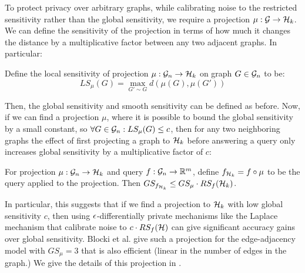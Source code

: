 To protect privacy over arbitrary graphs, while calibrating noise to the restricted sensitivity rather than the global sensitivity, we require a projection $\mu: \mathcal{G} \to \mathcal{H}_k$. We can define the sensitivity of the projection in terms of how much it changes the distance by a multiplicative factor between any two adjacent graphs. In particular:

\begin{definition}
Define the local sensitivity of projection $\mu: \mathcal{G}_n\to \mathcal{H}_k$ on graph $G \in \mathcal{G}_n$ to be:
$$LS_\mu(G) = \max_{G' \sim G} d(\mu(G), \mu(G' )) $$ 
\end{definition} 



Then, the global sensitivity and smooth sensitivity can be defined as before. Now, if we can find a projection $\mu$, where it is possible to bound the global sensitivity by a small constant, so $\forall G \in \mathcal{G}_n: LS_{\mu} (G)\leq c$, then for any two neighboring graphs the effect of first projecting a graph to $\mathcal{H}_k$ before answering a query only increases global sensitivity by a multiplicative factor of $c$:

\begin{lemma}
\label{lemma:restricted_sensitivity_edge}
For projection $\mu: \mathcal{G} _n\to \mathcal{H}_k$ and query $f: \mathcal{G}_n \to \mathbb{R}^m$, define $f_{\mathcal{H}_k} = f \circ \mu$ to be the query applied to the projection. Then $GS_{f_{\mathcal{H}_k}} \leq GS_{\mu} \cdot RS_f(\mathcal{H}_k)$.
\end{lemma}
In particular, this suggests that if we find a projection to $\mathcal{H}_k$ with low global sensitivity $c$, then using $\epsilon$-differentially private mechanisms like the Laplace mechanism that calibrate noise to $c \cdot RS_f(\mathcal{H})$ can give significant accuracy gains over global sensitivity. Blocki et al. give such a projection for the edge-adjacency model with $GS_\mu = 3$ that is also efficient (linear in the number of edges in the graph.) We give the details of this projection in .

